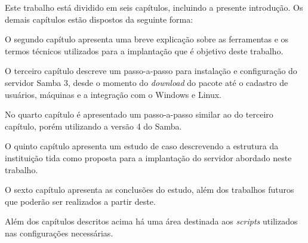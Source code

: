 Este trabalho está dividido em seis capítulos, incluindo a presente introdução. Os demais capítulos estão dispostos da seguinte forma:

O segundo capítulo apresenta uma breve explicação sobre as ferramentas e os termos técnicos utilizados para a implantação que é objetivo deste trabalho. 

O terceiro capítulo descreve um passo-a-passo para instalação e configuração do servidor Samba 3, desde o momento do \textit{download} do pacote até o cadastro de usuários, máquinas e a integração com o Windows e Linux.

No quarto capítulo é apresentado um passo-a-passo similar ao do terceiro capítulo, porém utilizando a versão 4 do Samba.

O quinto capítulo apresenta um estudo de caso descrevendo a estrutura da instituição tida como proposta para a implantação do servidor abordado neste trabalho.

O sexto capítulo apresenta as conclusões do estudo, além dos trabalhos futuros que poderão ser realizados a partir deste.

Além dos capítulos descritos acima há uma área destinada aos \textit{scripts} utilizados nas configurações necessárias.